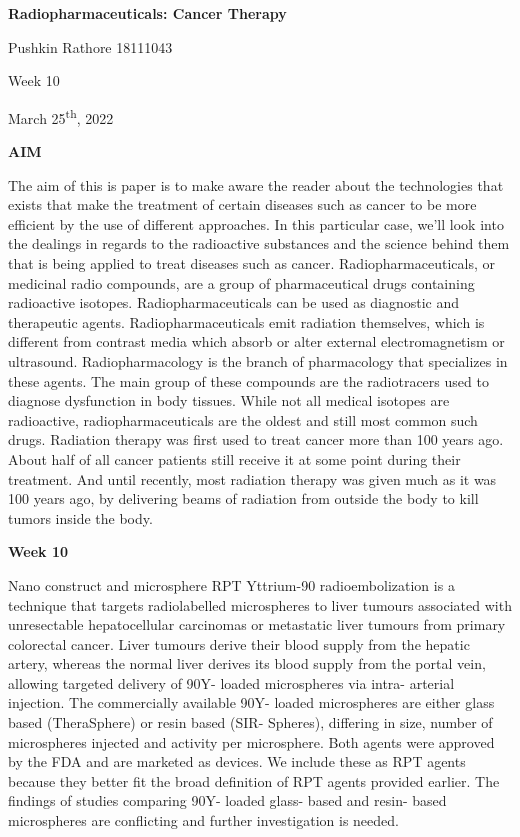 \documentclass[
]{article}
\author{}
\date{}
\begin{document}
\textbf{{Radiopharmaceuticals: Cancer Therapy}}

Pushkin Rathore 18111043

Week 10

March 25\textsuperscript{th}, 2022

\textbf{AIM}

The aim of this is paper is to make aware the reader about the
technologies that exists that make the treatment of certain diseases
such as cancer to be more efficient by the use of different approaches.
In this particular case, we'll look into the dealings in regards to the
radioactive substances and the science behind them that is being applied
to treat diseases such as cancer. Radiopharmaceuticals, or medicinal
radio compounds, are a group of pharmaceutical drugs containing
radioactive isotopes. Radiopharmaceuticals can be used as diagnostic and
therapeutic agents. Radiopharmaceuticals emit radiation themselves,
which is different from contrast media which absorb or alter external
electromagnetism or ultrasound. Radiopharmacology is the branch of
pharmacology that specializes in these agents. The main group of these
compounds are the radiotracers used to diagnose dysfunction in body
tissues. While not all medical isotopes are radioactive,
radiopharmaceuticals are the oldest and still most common such drugs.
Radiation therapy was first used to treat cancer more than 100 years
ago. About half of all cancer patients still receive it at some point
during their treatment. And until recently, most radiation therapy was
given much as it was 100 years ago, by delivering beams of radiation
from outside the body to kill tumors inside the body.

\textbf{Week 10}

Nano construct and microsphere RPT Yttrium-90 radioembolization is a
technique that targets radiolabelled microspheres to liver tumours
associated with unresectable hepatocellular carcinomas or metastatic
liver tumours from primary colorectal cancer. Liver tumours derive their
blood supply from the hepatic artery, whereas the normal liver derives
its blood supply from the portal vein, allowing targeted delivery of
90Y- loaded microspheres via intra- arterial injection. The commercially
available 90Y- loaded microspheres are either glass based (TheraSphere)
or resin based (SIR- Spheres), differing in size, number of microspheres
injected and activity per microsphere. Both agents were approved by the
FDA and are marketed as devices. We include these as RPT agents because
they better fit the broad definition of RPT agents provided earlier. The
findings of studies comparing 90Y- loaded glass- based and resin- based
microspheres are conflicting and further investigation is needed.
\end{document}

